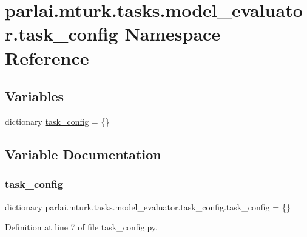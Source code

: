 \hypertarget{namespaceparlai_1_1mturk_1_1tasks_1_1model__evaluator_1_1task__config}{}\section{parlai.\+mturk.\+tasks.\+model\+\_\+evaluator.\+task\+\_\+config Namespace Reference}
\label{namespaceparlai_1_1mturk_1_1tasks_1_1model__evaluator_1_1task__config}
\subsection*{Variables}
\begin{DoxyCompactItemize}
\item 
dictionary \hyperlink{namespaceparlai_1_1mturk_1_1tasks_1_1model__evaluator_1_1task__config_aad4d5235d612d9a5389ce38c779bc4c3}{task\+\_\+config} = \{\}
\end{DoxyCompactItemize}


\subsection{Variable Documentation}
\mbox{\label{namespaceparlai_1_1mturk_1_1tasks_1_1model__evaluator_1_1task__config_aad4d5235d612d9a5389ce38c779bc4c3}} 
\subsubsection{\texorpdfstring{task\+\_\+config}{task\_config}}
{\footnotesize\ttfamily dictionary parlai.\+mturk.\+tasks.\+model\+\_\+evaluator.\+task\+\_\+config.\+task\+\_\+config = \{\}}



Definition at line 7 of file task\+\_\+config.\+py.

